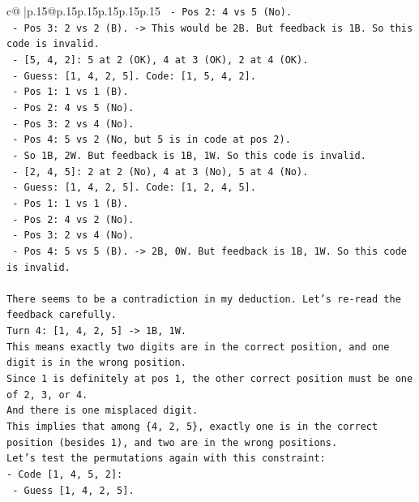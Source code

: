 \documentclass{article}
\begin{document}
{\begin{supertabular}{c@{$\;$}|p{.15\linewidth}@{}p{.15\linewidth}p{.15\linewidth}p{.15\linewidth}p{.15\linewidth}p{.15\linewidth}}
{{{\texttt{        {-} Pos 2: 4 vs 5 (No).} \\
\texttt{        {-} Pos 3: 2 vs 2 (B). {-}> This would be 2B. But feedback is 1B. So this code is invalid.} \\
\texttt{      {-} {[}5, 4, 2{]}: 5 at 2 (OK), 4 at 3 (OK), 2 at 4 (OK).} \\
\texttt{        {-} Guess: {[}1, 4, 2, 5{]}. Code: {[}1, 5, 4, 2{]}.} \\
\texttt{        {-} Pos 1: 1 vs 1 (B).} \\
\texttt{        {-} Pos 2: 4 vs 5 (No).} \\
\texttt{        {-} Pos 3: 2 vs 4 (No).} \\
\texttt{        {-} Pos 4: 5 vs 2 (No, but 5 is in code at pos 2).} \\
\texttt{        {-} So 1B, 2W. But feedback is 1B, 1W. So this code is invalid.} \\
\texttt{      {-} {[}2, 4, 5{]}: 2 at 2 (No), 4 at 3 (No), 5 at 4 (No).} \\
\texttt{        {-} Guess: {[}1, 4, 2, 5{]}. Code: {[}1, 2, 4, 5{]}.} \\
\texttt{        {-} Pos 1: 1 vs 1 (B).} \\
\texttt{        {-} Pos 2: 4 vs 2 (No).} \\
\texttt{        {-} Pos 3: 2 vs 4 (No).} \\
\texttt{        {-} Pos 4: 5 vs 5 (B). {-}> 2B, 0W. But feedback is 1B, 1W. So this code is invalid.} \\
\\ 
\texttt{There seems to be a contradiction in my deduction. Let's re{-}read the feedback carefully.} \\
\texttt{Turn 4: {[}1, 4, 2, 5{]} {-}> 1B, 1W.} \\
\texttt{This means exactly two digits are in the correct position, and one digit is in the wrong position.} \\
\texttt{Since 1 is definitely at pos 1, the other correct position must be one of 2, 3, or 4.} \\
\texttt{And there is one misplaced digit.} \\
\texttt{This implies that among \{4, 2, 5\}, exactly one is in the correct position (besides 1), and two are in the wrong positions.} \\
\texttt{Let's test the permutations again with this constraint:} \\
\texttt{{-} Code {[}1, 4, 5, 2{]}:} \\
\texttt{  {-} Guess {[}1, 4, 2, 5{]}.} \\
}}}
\end{supertabular}}
\end{document}
